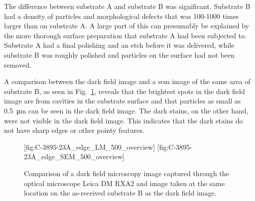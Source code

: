 The difference between substrate A and substrate B was significant. Substrate B had a density of particles and morphological defects that was 100-1000 times larger than on substrate A. A large part of this can presumably be explained by the more thorough surface preparation that substrate A had been subjected to. Substrate A had a final polishing and an etch before it was delivered, while substrate B was roughly polished and particles on the surface had not been removed.

A comparison between the dark field image and a \ac{sem} image of the same area of substrate B, as seen in Fig.~\ref{fig:LM_SEM_C3895}, reveals that the brightest spots in the dark field image are from cavities in the substrate surface and that particles as small as \SI{0.5}{\micro\metre} can be seen in the dark field image. The dark stains, on the other hand, were not visible in the dark field image. This indicates that the dark stains do not have sharp edges or other pointy features.

\begin{figure}[htbp]
    \centering
    [fig:C-3895-23A_edge_LM_500_overview]
    \hfill
    [fig:C-3895-23A_edge_SEM_500_overview]
    \caption[Comparison of dark field microscopy and \ac{sem} images.]{Comparison of  a dark field microscopy image captured through the optical microscope Leica DM RXA2 and   image taken at the same location on the as-received substrate B as the dark field image.}
    \label{fig:LM_SEM_C3895}
\end{figure}



